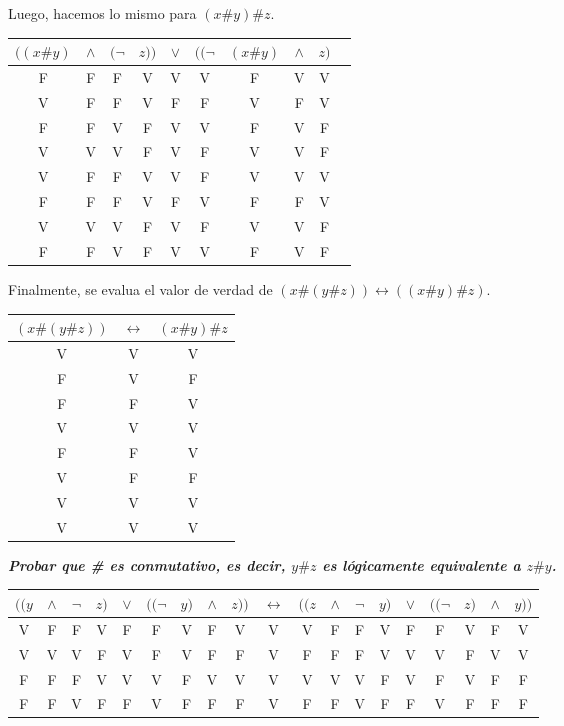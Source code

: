 \documentclass[osajnl,twocolumn,showpacs,superscriptaddress,10pt]{revtex4-1} %
\begin{document}
\newpage

Luego, hacemos lo mismo para $(x\#y)\#z$.

\begin{table}[h!]
  \setlength{\tabcolsep}{1.0em}
  \centering
  \begin{tabular}{cccc|c|ccccc}
    $((x\#y)$ & $\wedge$ & $(\neg$ & $z))$ & $\vee$ & $((\neg$ & $(x\#y)$ & $\wedge$ & $z)$\\
    \hline
    F & F & F & V & V & V & F & V & V\\
    V & F & F & V & F & F & V & F & V\\
    F & F & V & F & V & V & F & V & F\\
    V & V & V & F & V & F & V & V & F\\
    V & F & F & V & V & F & V & V & V\\
    F & F & F & V & F & V & F & F & V\\
    V & V & V & F & V & F & V & V & F\\
    F & F & V & F & V & V & F & V & F
  \end{tabular}
\end{table}

Finalmente, se evalua el valor de verdad de $(x\#(y\#z)) \leftrightarrow ((x\#y)\#z)$.

\begin{table}[h!]
  \setlength{\tabcolsep}{1.0em}
  \centering
  \begin{tabular}{c|c|c}
    $(x\#(y\#z))$ & $\leftrightarrow$ & $(x\#y)\#z$\\
    \hline
    V & V & V\\
    F & V & F\\
    F & F & V\\
    V & V & V\\
    F & F & V\\
    V & F & F\\
    V & V & V\\
    V & V & V
  \end{tabular}
\end{table}

\textbf{\textit{Probar que \# es conmutativo, es decir, $y\#z$ es lógicamente equivalente a $z\#y$.}}

\begin{table}[h!]
  \setlength{\tabcolsep}{0.5em}
  \centering
  \begin{tabular}{ccccccccc|c|ccccccccc}
    $((y$ & $\wedge$ & $\neg$ & $z)$ & $\vee$ & $((\neg$ & $y)$ & $\wedge$ & $z))$ & $\leftrightarrow$ & $((z$ & $\wedge$ & $\neg$ & $y)$ & $\vee$ & $((\neg$ & $z)$ & $\wedge$ & $y))$\\
    \hline
    V & F & F & V & F & F & V & F & V & V & V & F & F & V & F & F & V & F & V\\
    V & V & V & F & V & F & V & F & F & V & F & F & F & V & V & V & F & V & V\\
    F & F & F & V & V & V & F & V & V & V & V & V & V & F & V & F & V & F & F\\
    F & F & V & F & F & V & F & F & F & V & F & F & V & F & F & V & F & F & F
  \end{tabular}
\end{table}
\end{document}
